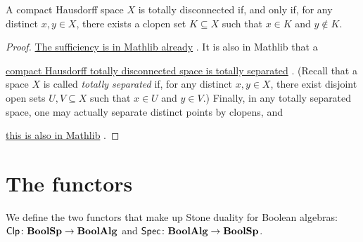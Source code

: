\documentclass[a4paper,10pt]{article}
\numberwithin{theorem}{section}
\newcommand{\docref}[3]{
    \href{
        https://leanprover-community.github.io/mathlib4_docs/Mathlib/#1.html\##2
    }{#3}
}
\begin{document}
\begin{lemma}\label{BoolSpchar}
    A compact Hausdorff space $X$ is totally disconnected if, and only if, for
    any distinct $x, y \in X$, there exists a clopen set $K \subseteq X$ such
    that $x \in K$ and $y \not\in K$.
\end{lemma}
\begin{proof}
   \docref{Topology/Connected/TotallyDisconnected}{isTotallyDisconnected_of_isClopen_set}{The
   sufficiency is in Mathlib already}. It is also in Mathlib that a
   \docref{Topology/Separation}{instTotallySeparatedSpace}{compact
   Hausdorff totally disconnected space is totally separated}. (Recall that a
   space $X$ is called \emph{totally separated} if, for any distinct $x,y \in
   X$, there exist disjoint open sets $U, V \subseteq X$ such that $x \in U$
   and $y \in V$.) Finally, in any totally separated space, one may actually
   separate distinct points by clopens, and
   \docref{Topology/Connected/TotallyDisconnected}
   {exists_isClopen_of_totally_separated}{this is also in Mathlib}.
\end{proof}
\section{The functors}
We define the two functors that make up Stone duality for Boolean algebras:
$\operatorname*{\mathsf{Clp}} \colon \mathbf{BoolSp} \to \mathbf{BoolAlg}$ and $\operatorname*{\mathsf{Spec}} \colon \mathbf{BoolAlg} \to \mathbf{BoolSp}$.
\end{document}
